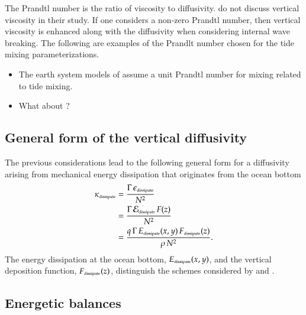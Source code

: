 The Prandtl number is the ratio of viscosity to diffusivity.
\cite{Simmonsetal2004} do not discuss vertical viscosity in their
study.  If one considers a non-zero Prandtl number, then vertical
viscosity is enhanced along with the diffusivity when considering
internal wave breaking.  The following are examples of the Prandlt
number chosen for the tide mixing parameterizations.
\begin{itemize}

\item The earth system models of \cite{Dunne_etal_part1_2012} assume a
  unit Prandtl number for mixing related to tide mixing.

\item What about \cite{Jayne2009}?  

\end{itemize}


\subsection{General form of the vertical diffusivity}
\label{subsection:general-form-tide-diffusivity}

The previous considerations lead to the following general form for a
diffusivity arising from mechanical energy dissipation that originates
from the ocean bottom
\begin{equation}
\begin{split}
 \kappa_{\mbox{\tiny dissipate}} &= 
 \frac{\Gamma \, \epsilon_{\mbox{\tiny dissipate}}}{N^{2}}
\\
 &=\frac{\Gamma \, {\cal E}_{\mbox{\tiny dissipate}} \, F(z) }{N^{2}}
\\
 &=
 \frac{q \, \Gamma \, E_{\mbox{\tiny dissipate}}(x,y) \,  F_{\mbox{\tiny dissipate}}(z)}  {\rho \, N^2}.
\end{split}
\label{eq:wave-vert-kappa-general-bottom}
\end{equation}
The energy dissipation at the ocean bottom, $ E_{\mbox{\tiny
    dissipate}}(x,y)$, and the vertical deposition function,
$F_{\mbox{\tiny dissipate}}(z)$, distinguish the schemes considered by
\cite{Simmonsetal2004} and \cite{Melet_etal_2013}.


\subsection{Energetic balances}

